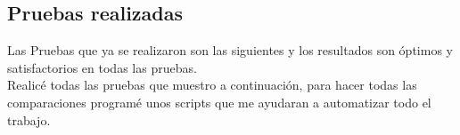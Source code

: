 \documentclass[12pt]{article}
\newcommand\tab[1][0.5cm]{\hspace*{#1}}
\newcommand\vtab[1][0.5cm]{\vspace*{#1}}
\begin{document}
\subsection{Pruebas realizadas}
Las Pruebas que ya se realizaron son las siguientes y los resultados son óptimos y satisfactorios en todas las pruebas.\\
Realicé todas las pruebas que muestro a continuación, para hacer todas las comparaciones programé unos scripts que me ayudaran a 
automatizar todo el trabajo.

\end{document}
